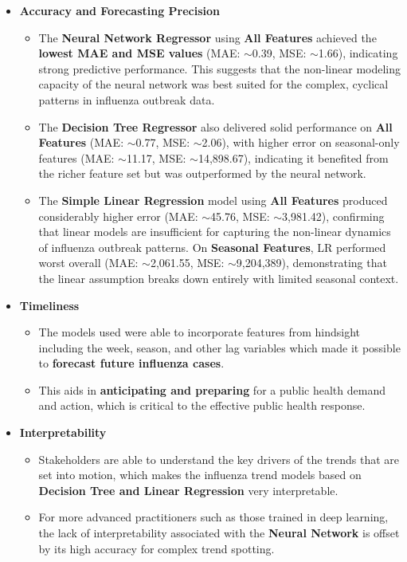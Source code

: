 \begin{itemize}
  \item \textbf{Accuracy and Forecasting Precision}
  \begin{itemize}
    \item The \textbf{Neural Network Regressor} using \textbf{All Features} achieved the \textbf{lowest MAE and MSE values} (MAE: \(\sim\)0.39, MSE: \(\sim\)1.66), indicating strong predictive performance. This suggests that the non-linear modeling capacity of the neural network was best suited for the complex, cyclical patterns in influenza outbreak data.
    \item The \textbf{Decision Tree Regressor} also delivered solid performance on \textbf{All Features} (MAE: \(\sim\)0.77, MSE: \(\sim\)2.06), with higher error on seasonal-only features (MAE: \(\sim\)11.17, MSE: \(\sim\)14,898.67), indicating it benefited from the richer feature set but was outperformed by the neural network.
    \item The \textbf{Simple Linear Regression} model using \textbf{All Features} produced considerably higher error (MAE: \(\sim\)45.76, MSE: \(\sim\)3,981.42), confirming that linear models are insufficient for capturing the non-linear dynamics of influenza outbreak patterns. On \textbf{Seasonal Features}, LR performed worst overall (MAE: \(\sim\)2,061.55, MSE: \(\sim\)9,204,389), demonstrating that the linear assumption breaks down entirely with limited seasonal context.
  \end{itemize}
  \item \textbf{Timeliness}
  \begin{itemize}
    \item The models used were able to incorporate features from hindsight including the week, season, and other lag variables which made it possible to \textbf{forecast future influenza cases}.
    \item This aids in \textbf{anticipating and preparing} for a public health demand and action, which is critical to the effective public health response.
  \end{itemize}
  \item \textbf{Interpretability}
  \begin{itemize}
    \item Stakeholders are able to understand the key drivers of the trends that are set into motion, which makes the influenza trend models based on \textbf{Decision Tree and Linear Regression} very interpretable.
    \item For more advanced practitioners such as those trained in deep learning, the lack of interpretability associated with the \textbf{Neural Network} is offset by its high accuracy for complex trend spotting.
  \end{itemize}
\end{itemize}

